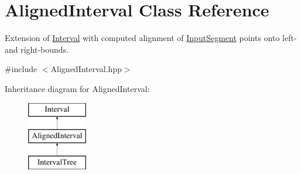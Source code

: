 \hypertarget{classAlignedInterval}{}\section{Aligned\+Interval Class Reference}
\label{classAlignedInterval}


Extension of \mbox{\hyperlink{classInterval}{Interval}} with computed alignment of \mbox{\hyperlink{classInputSegment}{Input\+Segment}} points onto left-\/ and right-\/bounds.  




{\ttfamily \#include $<$Aligned\+Interval.\+hpp$>$}

Inheritance diagram for Aligned\+Interval\+:\begin{figure}[H]
\begin{center}
\leavevmode
\includegraphics[height=3.000000cm]{classAlignedInterval}
\end{center}
\end{figure}

